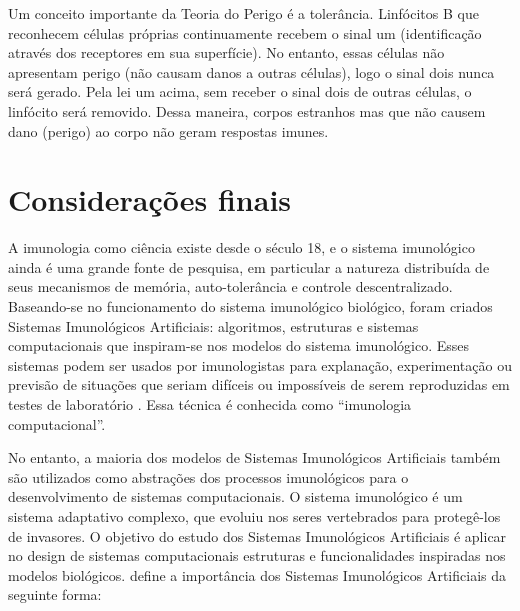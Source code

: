 Um conceito importante da Teoria do Perigo é a tolerância. Linfócitos B que reconhecem células próprias continuamente recebem o sinal um (identificação através dos receptores em sua superfície). No entanto, essas células não apresentam perigo (não causam danos a outras células), logo o sinal dois nunca será gerado. Pela lei um acima, sem receber o sinal dois de outras células, o linfócito será removido. Dessa maneira, corpos estranhos mas que não causem dano (perigo) ao corpo não geram respostas imunes.

\section{Considerações finais}

A imunologia como ciência existe desde o século 18, e o sistema imunológico ainda é uma grande fonte de pesquisa, em particular a natureza distribuída de seus mecanismos de memória, auto-tolerância e controle descentralizado. Baseando-se no funcionamento do sistema imunológico biológico, foram criados Sistemas Imunológicos Artificiais: algoritmos, estruturas e sistemas computacionais que inspiram-se nos modelos do sistema imunológico. Esses sistemas podem ser usados por imunologistas para explanação, experimentação ou previsão de situações que seriam difíceis ou impossíveis de serem reproduzidas em testes de laboratório \cite{Garrett2005}. Essa técnica é conhecida como ``imunologia computacional''.

No entanto, a maioria dos modelos de Sistemas Imunológicos Artificiais também são utilizados como abstrações dos processos imunológicos para o desenvolvimento de sistemas computacionais. O sistema imunológico é um sistema adaptativo complexo, que evoluiu nos seres vertebrados para protegê-los de invasores. O objetivo do estudo dos Sistemas Imunológicos Artificiais é aplicar no design de sistemas computacionais estruturas e funcionalidades inspiradas nos modelos biológicos. \citeauthor{Dasgupta2006} define a importância dos Sistemas Imunológicos Artificiais da seguinte forma:


